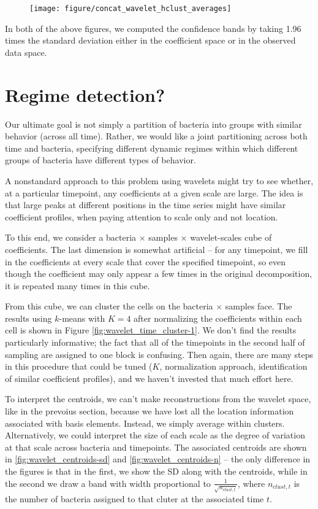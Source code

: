 \documentclass{article}
\begin{document}
\begin{figure}[ht]
  \centering
  \texttt{[image: figure/concat\_wavelet\_hclust\_averages]}
  \caption{\label{fig:concat_wavelet_hclust_averages} }
\end{figure}

In both of the above figures, we computed the confidence bands by taking 1.96
times the standard deviation either in the coefficient space or in the observed
data space.

\section{Regime detection?}

Our ultimate goal is not simply a partition of bacteria into groups with similar
behavior (across all time). Rather, we would like a joint partitioning across
both time and bacteria, specifying different dynamic regimes within which
different groups of bacteria have different types of behavior.

A nonstandard approach to this problem using wavelets might try to see whether,
at a particular timepoint, any coefficients at a given scale are large. The idea
is that large peaks at different positions in the time series might have similar
coefficient profiles, when paying attention to scale only and not location.

To this end, we consider a bacteria $\times$ samples $\times$ wavelet-scales
cube of coefficients. The last dimension is somewhat artificial -- for any
timepoint, we fill in the coefficients at every scale that cover the specified
timepoint, so even though the coefficient may only appear a few times in the
original decomposition, it is repeated many times in this cube.

From this cube, we can cluster the cells on the bacteria $\times$ samples face.
The results using $k$-means with $K = 4$ after normalizing the coefficients
within each cell is shown in Figure \ref{fig:wavelet_time_cluster-1}. We don't
find the results particularly informative; the fact that all of the timepoints
in the second half of sampling are assigned to one block is confusing. Then
again, there are many steps in this procedure that could be tuned ($K$,
normalization approach, identification of similar coefficient profiles), and we
haven't invested that much effort here.

To interpret the centroids, we can't make reconstructions from the wavelet
space, like in the prevoius section, because we have lost all the location
information associated with basis elements. Instead, we simply average within
clusters. Alternatively, we could interpret the size of each scale as the degree
of variation at that scale across bacteria and timepoints. The associated
centroids are shown in \ref{fig:wavelet_centroids-sd} and
\ref{fig:wavelet_centroids-n} -- the only difference in the figures is that in
the first, we show the SD along with the centroids, while in the second we draw
a band with width proportional to $\frac{1}{\sqrt{n_{clust, t}}}$, where
$n_{clust, t}$ is the number of bacteria assigned to that cluter at the
associated time $t$.
\end{document}
